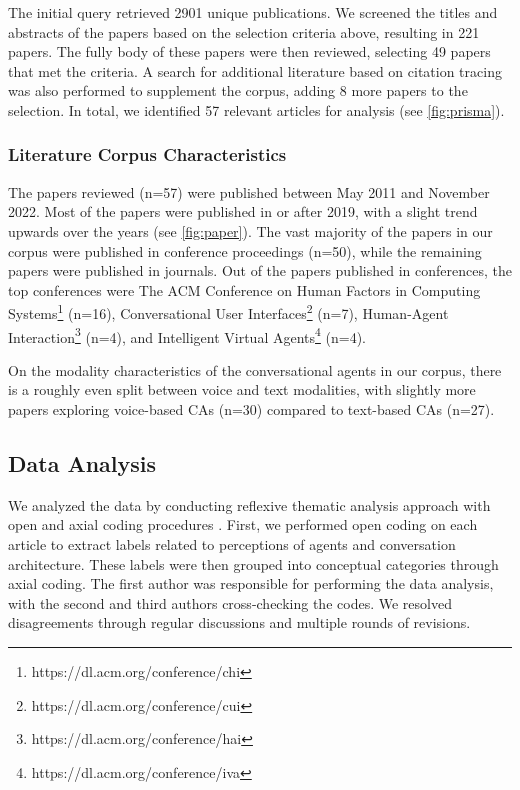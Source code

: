 The initial query retrieved 2901 unique publications. We screened the titles and abstracts of the papers based on the selection criteria above, resulting in 221 papers. The fully body of these papers were then reviewed, selecting 49 papers that met the criteria. A search for additional literature based on citation tracing was also performed to supplement the corpus, adding 8 more papers to the selection. In total, we identified 57 relevant articles for analysis (see \autoref{fig:prisma}).



\subsubsection*{Literature Corpus Characteristics}

The papers reviewed (n=57) were published between May 2011 and November 2022. Most of the papers were published in or after 2019, with a slight trend upwards over the years (see \autoref{fig:paper}). The vast majority of the papers in our corpus were published in conference proceedings (n=50), while the remaining papers were published in journals. Out of the papers published in conferences, the top conferences were The ACM Conference on Human Factors in Computing Systems\footnote{https://dl.acm.org/conference/chi} (n=16), Conversational User Interfaces\footnote{https://dl.acm.org/conference/cui} (n=7), Human-Agent Interaction\footnote{https://dl.acm.org/conference/hai} (n=4), and Intelligent Virtual Agents\footnote{https://dl.acm.org/conference/iva} (n=4). 

On the modality characteristics of the conversational agents in our corpus, there is a roughly even split between voice and text modalities, with slightly more papers exploring voice-based CAs (n=30) compared to text-based CAs (n=27).



\subsection{Data Analysis}

We analyzed the data by conducting reflexive thematic analysis approach with open and axial coding procedures \mbox{\cite{braun2019reflecting}}. First, we performed open coding on each article to extract labels related to perceptions of agents and conversation architecture. These labels were then grouped into conceptual categories through axial coding. The first author was responsible for performing the data analysis, with the second and third authors cross-checking the codes. We resolved disagreements through regular discussions and multiple rounds of revisions.

